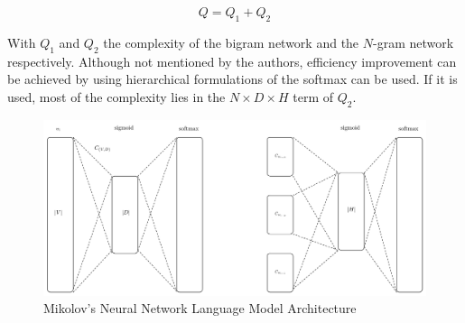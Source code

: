 \begin{equation} Q = Q_1 + Q_2
\end{equation}

With $Q_1$ and $Q_2$ the complexity of the bigram network and the $N$-gram
network respectively. Although not mentioned by the authors, efficiency
improvement can be achieved by using hierarchical formulations of the softmax
can be used. If it is used, most of the complexity  lies in the  $N \times D \times
H$ term of $Q_2$.

\begin{figure}[hptb!]
    \centering
    \includegraphics[width=1.0\textwidth]{images/mikolov-fnnl-latex.pdf} 
    \caption{Mikolov's Neural Network Language Model Architecture}
    \label{fig:mikolov_nnlm_architecture}
\end{figure}
  










